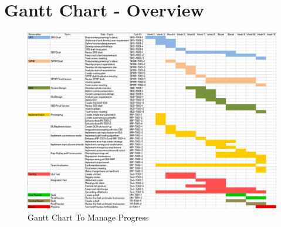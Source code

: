 \appendix

\section{Gantt Chart - Overview}
\begin{figure}[H]
	\centering
	\hspace*{-1.3in}
	\includegraphics[width=1.5\linewidth]{gantt-chart.PNG}  %
	\caption{Gantt Chart To Manage Progress}
	\label{gantt-chart-overview}
\end{figure}

%
